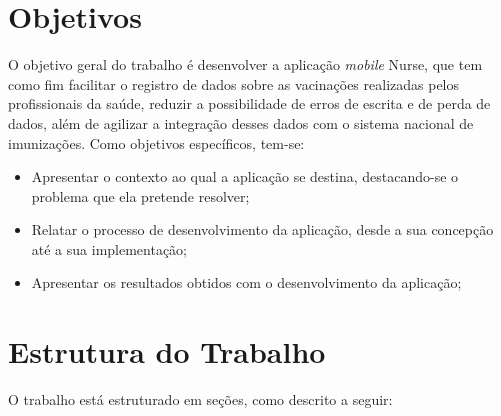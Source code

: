 




\section{Objetivos}
\label{cap1:Sec:Objetivos}

O objetivo geral do trabalho é desenvolver a aplicação \textit{mobile} Nurse, que tem como fim facilitar o registro de dados sobre as vacinações realizadas pelos profissionais da saúde, reduzir a possibilidade de erros de escrita e de perda de dados, além de agilizar a integração desses dados com o sistema nacional de imunizações. Como objetivos específicos, tem-se:
\begin{itemize}
  \item Apresentar o contexto ao qual a aplicação se destina, destacando-se o problema que ela pretende resolver;
  \item Relatar o processo de desenvolvimento da aplicação, desde a sua concepção até a sua implementação;
  \item Apresentar os resultados obtidos com o desenvolvimento da aplicação;
\end{itemize}

\section{Estrutura do Trabalho}
\label{cap1:Sec:EstruturaTrabalho}

O trabalho está estruturado em seções, como descrito a seguir: 


